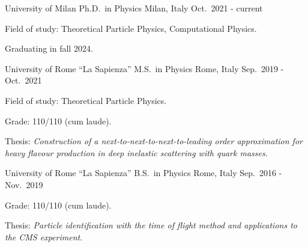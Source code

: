 

\begin{cventries}

    \cventry
        {University of Milan} %
        {Ph.D.\ in Physics} %
        {Milan, Italy} %
        {Oct.\ 2021 - current} %
        {
        \begin{cvitems} %
            \item Field of study: Theoretical Particle Physics, Computational Physics.
            \item Graduating in fall 2024.
        \end{cvitems}
        }

    \cventry
        {University of Rome ``La Sapienza''} %
        {M.S.\ in Physics} %
        {Rome, Italy} %
        {Sep.\ 2019 - Oct.\ 2021} %
        {
        \begin{cvitems} %
            \item Field of study: Theoretical Particle Physics.
            \item Grade: 110/110 (cum laude).
            \item Thesis: \emph{Construction of a next-to-next-to-next-to-leading order approximation for heavy flavour production in deep inelastic scattering with quark masses}. \href{https://inspirehep.net/literature/2750247}{\textcolor{red}{}}
        \end{cvitems}
        }

    \cventry
        {University of Rome ``La Sapienza''} %
        {B.S.\ in Physics} %
        {Rome, Italy} %
        {Sep.\ 2016 - Nov.\ 2019} %
        {
        \begin{cvitems} %
            \item Grade: 110/110 (cum laude).
            \item Thesis: \emph{Particle identification with the time of flight method and applications to the CMS experiment}.
        \end{cvitems}
        }

\end{cventries}